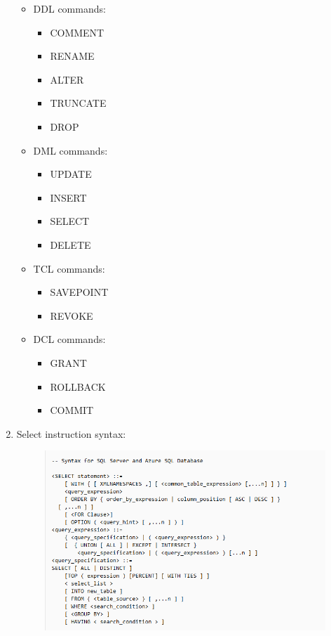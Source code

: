 \documentclass[12pt]{article}
\begin{document}
\begin{enumerate}
\begin{itemize}
                \item  DDL commands:
                \begin{itemize}                 
                        \item COMMENT 
                        \item RENAME 
                        \item ALTER 
                        \item TRUNCATE 
                        \item DROP 
                \end{itemize}
                \item  DML commands:
                \begin{itemize}                 
                        \item UPDATE  
                        \item INSERT  
                        \item SELECT  
                        \item DELETE  
                \end{itemize}
                \item  TCL  commands:
                \begin{itemize}                 
                        \item SAVEPOINT    
                        \item REVOKE     
                \end{itemize}
                \item  DCL   commands:   
                \begin{itemize}                 
                        \item GRANT    
                        \item ROLLBACK   
                        \item COMMIT    
                \end{itemize}
                \end{itemize}
                \item Select instruction syntax:\cite{MSSQL_}
                \begin{figure}[H]
                        \centering
                        \includegraphics[width=.95\textwidth]{img.png}

\end{figure}
\end{enumerate}
\end{document}
